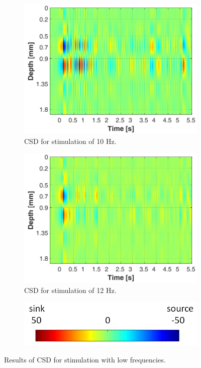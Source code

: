 \documentclass{pracalicmgr}
\begin{document}
\begin{figure}[H]
	\begin{subfigure}{.5\textwidth}
		\centering
		\includegraphics[width=1.\linewidth]{csd_10Hz_5s.png}
		\caption{CSD for stimulation of 10 Hz.}
		\label{rys:csd_10Hz}
	\end{subfigure}
	\begin{subfigure}{.5\textwidth}
		\centering
		\includegraphics[width=1.\linewidth]{csd_12Hz_5s.png}
		\caption{CSD for stimulation of 12 Hz.}
		\label{rys:csd_12Hz}
	\end{subfigure}
	
	\begin{subfigure}{\textwidth}
	\centering
	\includegraphics[scale=0.4]{legend2.png}
	\end{subfigure}
	
	\caption{Results of CSD for stimulation with low frequencies.}
	\label{rys:csd}
	
	\end{figure}
\end{document}
